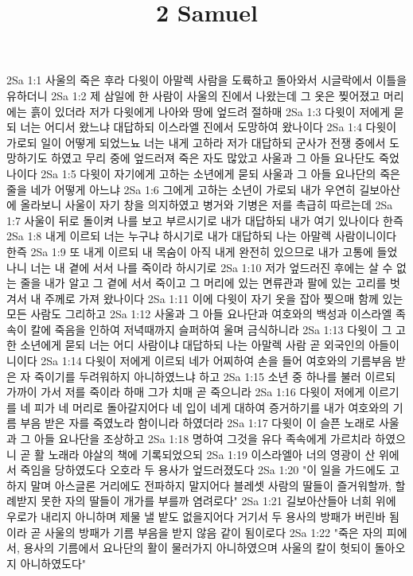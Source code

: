 

\title{2 Samuel}

2Sa 1:1  사울의 죽은 후라 다윗이 아말렉 사람을 도륙하고 돌아와서 시글락에서 이틀을 유하더니
2Sa 1:2  제 삼일에 한 사람이 사울의 진에서 나왔는데 그 옷은 찢어졌고 머리에는 흙이 있더라 저가 다윗에게 나아와 땅에 엎드려 절하매
2Sa 1:3  다윗이 저에게 묻되 너는 어디서 왔느냐 대답하되 이스라엘 진에서 도망하여 왔나이다
2Sa 1:4  다윗이 가로되 일이 어떻게 되었느뇨 너는 내게 고하라 저가 대답하되 군사가 전쟁 중에서 도망하기도 하였고 무리 중에 엎드러져 죽은 자도 많았고 사울과 그 아들 요나단도 죽었나이다
2Sa 1:5  다윗이 자기에게 고하는 소년에게 묻되 사울과 그 아들 요나단의 죽은 줄을 네가 어떻게 아느냐
2Sa 1:6  그에게 고하는 소년이 가로되 내가 우연히 길보아산에 올라보니 사울이 자기 창을 의지하였고 병거와 기병은 저를 촉급히 따르는데
2Sa 1:7  사울이 뒤로 돌이켜 나를 보고 부르시기로 내가 대답하되 내가 여기 있나이다 한즉
2Sa 1:8  내게 이르되 너는 누구냐 하시기로 내가 대답하되 나는 아말렉 사람이니이다 한즉
2Sa 1:9  또 내게 이르되 내 목숨이 아직 내게 완전히 있으므로 내가 고통에 들었나니 너는 내 곁에 서서 나를 죽이라 하시기로
2Sa 1:10  저가 엎드러진 후에는 살 수 없는 줄을 내가 알고 그 곁에 서서 죽이고 그 머리에 있는 면류관과 팔에 있는 고리를 벗겨서 내 주께로 가져 왔나이다
2Sa 1:11  이에 다윗이 자기 옷을 잡아 찢으매 함께 있는 모든 사람도 그리하고
2Sa 1:12  사울과 그 아들 요나단과 여호와의 백성과 이스라엘 족속이 칼에 죽음을 인하여 저녁때까지 슬퍼하여 울며 금식하니라
2Sa 1:13  다윗이 그 고한 소년에게 묻되 너는 어디 사람이냐 대답하되 나는 아말렉 사람 곧 외국인의 아들이니이다
2Sa 1:14  다윗이 저에게 이르되 네가 어찌하여 손을 들어 여호와의 기름부음 받은 자 죽이기를 두려워하지 아니하였느냐 하고
2Sa 1:15  소년 중 하나를 불러 이르되 가까이 가서 저를 죽이라 하매 그가 치매 곧 죽으니라
2Sa 1:16  다윗이 저에게 이르기를 네 피가 네 머리로 돌아갈지어다 네 입이 네게 대하여 증거하기를 내가 여호와의 기름 부음 받은 자를 죽였노라 함이니라 하였더라
2Sa 1:17  다윗이 이 슬픈 노래로 사울과 그 아들 요나단을 조상하고
2Sa 1:18  명하여 그것을 유다 족속에게 가르치라 하였으니 곧 활 노래라 야살의 책에 기록되었으되
2Sa 1:19  이스라엘아 너의 영광이 산 위에서 죽임을 당하였도다 오호라 두 용사가 엎드러졌도다
2Sa 1:20  "이 일을 가드에도 고하지 말며 아스글론 거리에도 전파하지 말지어다 블레셋 사람의 딸들이 즐거워할까, 할례받지 못한 자의 딸들이 개가를 부를까 염려로다"
2Sa 1:21  길보아산들아 너희 위에 우로가 내리지 아니하며 제물 낼 밭도 없을지어다 거기서 두 용사의 방패가 버린바 됨이라 곧 사울의 방패가 기름 부음을 받지 않음 같이 됨이로다
2Sa 1:22  "죽은 자의 피에서, 용사의 기름에서 요나단의 활이 물러가지 아니하였으며 사울의 칼이 헛되이 돌아오지 아니하였도다"
